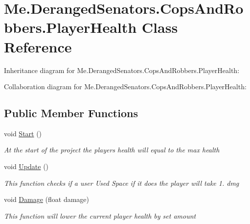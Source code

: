 \hypertarget{classMe_1_1DerangedSenators_1_1CopsAndRobbers_1_1PlayerHealth}{}\section{Me.\+Deranged\+Senators.\+Cops\+And\+Robbers.\+Player\+Health Class Reference}
\label{classMe_1_1DerangedSenators_1_1CopsAndRobbers_1_1PlayerHealth}


Inheritance diagram for Me.\+Deranged\+Senators.\+Cops\+And\+Robbers.\+Player\+Health\+:


Collaboration diagram for Me.\+Deranged\+Senators.\+Cops\+And\+Robbers.\+Player\+Health\+:
\subsection*{Public Member Functions}
\begin{DoxyCompactItemize}
\item 
void \hyperlink{classMe_1_1DerangedSenators_1_1CopsAndRobbers_1_1PlayerHealth_a738f74e006b34cc3584906614d9c6c75}{Start} ()
\begin{DoxyCompactList}\small\item\em At the start of the project the player\textquotesingle{}s health will equal to the max health \end{DoxyCompactList}\item 
void \hyperlink{classMe_1_1DerangedSenators_1_1CopsAndRobbers_1_1PlayerHealth_a83cc2195c8a20f4ddef3d2d5e567c998}{Update} ()
\begin{DoxyCompactList}\small\item\em This function checks if a user Used Space if it does the player will take 1. dmg \end{DoxyCompactList}\item 
void \hyperlink{classMe_1_1DerangedSenators_1_1CopsAndRobbers_1_1PlayerHealth_ae6f3fca7021e61a5e901d1aaff404e26}{Damage} (float damage)
\begin{DoxyCompactList}\small\item\em This function will lower the current player health by set amount \end{DoxyCompactList}\end{DoxyCompactItemize}

